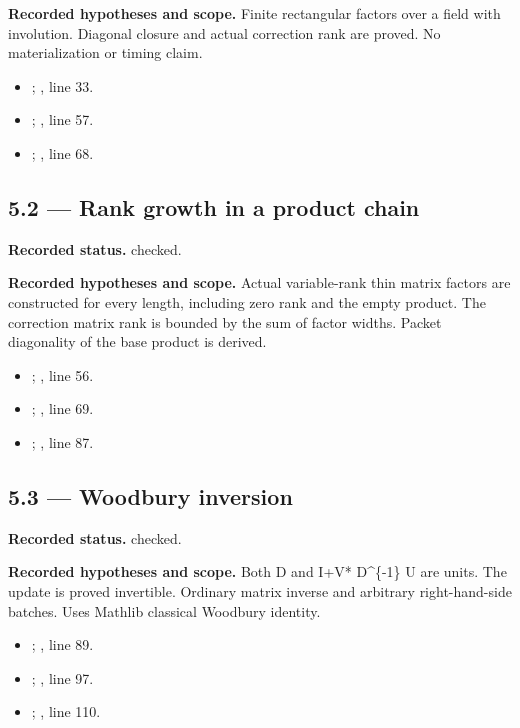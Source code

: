 \textbf{Recorded hypotheses and scope.} Finite rectangular factors over a field with involution. Diagonal closure and actual correction rank are proved. No materialization or timing claim.

\begin{itemize}
\item {}; , line 33.
\item {}; , line 57.
\item {}; , line 68.
\end{itemize}
\subsection{5.2 — Rank growth in a product chain}
\label{result:5.2}
\textbf{Recorded status.} checked.

\textbf{Recorded hypotheses and scope.} Actual variable-rank thin matrix factors are constructed for every length, including zero rank and the empty product. The correction matrix rank is bounded by the sum of factor widths. Packet diagonality of the base product is derived.

\begin{itemize}
\item {}; , line 56.
\item {}; , line 69.
\item {}; , line 87.
\end{itemize}
\subsection{5.3 — Woodbury inversion}
\label{result:5.3}
\textbf{Recorded status.} checked.

\textbf{Recorded hypotheses and scope.} Both D and I+V* D\textasciicircum{}\{-1\} U are units. The update is proved invertible. Ordinary matrix inverse and arbitrary right-hand-side batches. Uses Mathlib classical Woodbury identity.

\begin{itemize}
\item {}; , line 89.
\item {}; , line 97.
\item {}; , line 110.
\end{itemize}
